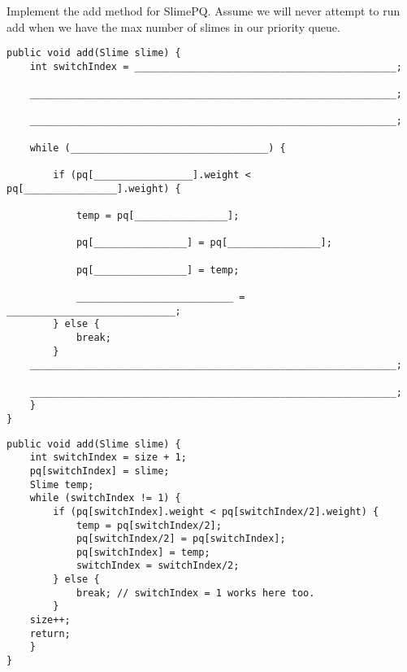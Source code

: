 \begin{blocksection}
\question Implement the add method for SlimePQ. Assume we will never attempt to run add when we have the max number of slimes in our priority queue. 
\\
\begin{lstlisting}
public void add(Slime slime) {
    int switchIndex = _____________________________________________;
    
    _______________________________________________________________;
    
    _______________________________________________________________;
    
    while (__________________________________) {
    
        if (pq[_________________].weight < pq[________________].weight) {
        
            temp = pq[________________];
            
            pq[________________] = pq[________________];
            
            pq[________________] = temp;
            
            ___________________________ = _____________________________;
        } else {
            break;
        }
    _______________________________________________________________;
    
    _______________________________________________________________;
    }
}
\end{lstlisting}
\begin{solution}
\begin{lstlisting}
public void add(Slime slime) {
    int switchIndex = size + 1;
    pq[switchIndex] = slime;
    Slime temp;
    while (switchIndex != 1) {
        if (pq[switchIndex].weight < pq[switchIndex/2].weight) {
            temp = pq[switchIndex/2];
            pq[switchIndex/2] = pq[switchIndex];
            pq[switchIndex] = temp;
            switchIndex = switchIndex/2;
        } else {
            break; // switchIndex = 1 works here too. 
        }
    size++;
    return;
    }
}
\end{lstlisting}
\end{solution}
\clearpage
\end{blocksection}
